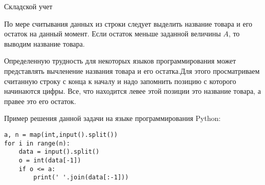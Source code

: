 \begin{tutorial}{Складской учет}

По мере считывания данных из строки следует выделить название товара и его остаток на данный момент. Если остаток меньше заданной величины $A$, то выводим название товара.

Определенную трудность для некоторых языков программирования может представлять вычленение названия товара и его остатка.Для этого просматриваем считанную строку с конца к началу и надо запомнить позицию с которого начинаются цифры. Все, что находится левее этой позиции это название товара, а правее это его остаток.

Пример решения данной задачи на языке программирования Python:

\begin{verbatim}
a, n = map(int,input().split())
for i in range(n):
    data = input().split()
    o = int(data[-1])
    if o <= a:
        print(' '.join(data[:-1]))
\end{verbatim}

\end{tutorial}
